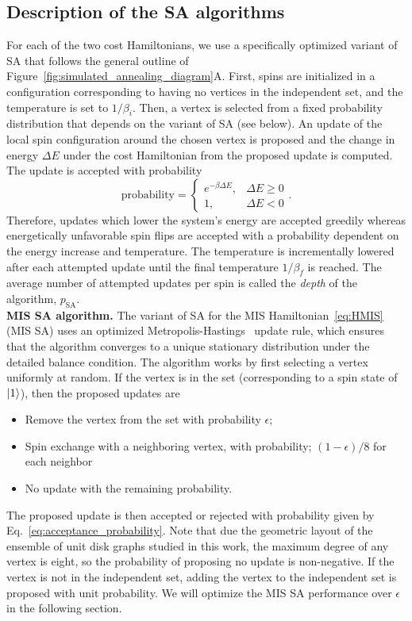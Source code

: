 \documentclass[twocolumn,amssymb,secnumarabic, prl, aps, nofootinbib]{revtex4-1}
\begin{document}
\subsection{Description of the SA algorithms\label{subsec:SA_description}}
For each of the two cost Hamiltonians, we use a specifically optimized variant of SA that follows the general outline of Figure~\ref{fig:simulated_annealing_diagram}A.
First, spins are initialized in a configuration corresponding to having no vertices in the independent set, and the temperature is set to $1/\beta_i$. Then, a vertex is selected from a fixed probability distribution that depends on the variant of SA (see below). An update of the local spin configuration around the chosen vertex is proposed and the change in energy $\Delta E$ under the cost Hamiltonian from the proposed update is computed. The update is accepted with probability
\begin{equation}
	\text{probability} = \begin{cases}
		e^{-\beta\Delta E}, & \Delta E \geq 0 \\
		1, & \Delta E < 0
	\end{cases}.\label{eq:acceptance_probability}
\end{equation}
Therefore, updates which lower the system's energy are accepted greedily whereas energetically unfavorable spin flips are accepted with a probability dependent on the energy increase and temperature. The temperature is incrementally lowered after each attempted update until the final temperature $1/\beta_f$ is reached. The average number of attempted updates per spin is called the \textit{depth} of the algorithm, $p_{\text{SA}}$.\\

\noindent\textbf{MIS SA algorithm.}
The variant of SA for the MIS Hamiltonian~\eqref{eq:HMIS} (MIS SA) uses an optimized Metropolis-Hastings~\cite{Hastings, Metropolis} update rule, which ensures that the algorithm converges to a unique stationary distribution under the detailed balance condition. The algorithm works by first selecting a vertex uniformly at random. If the vertex is in the set (corresponding to a spin state of $\ket{1}$), 
then the proposed updates are
\begin{itemize}
	\item Remove the vertex from the set with probability $\epsilon$;
	\item Spin exchange with a neighboring vertex,  with probability; $(1-\epsilon)/8$ for each neighbor
	\item No update with the remaining probability.
\end{itemize}
The proposed update is then accepted or rejected with probability given by Eq.~\eqref{eq:acceptance_probability}.
Note that due the geometric layout of the ensemble of unit disk graphs studied in this work, the maximum degree of any vertex is eight, so the probability of proposing no update is non-negative. If the vertex is not in the independent set, adding the vertex to the independent set is proposed with unit probability. 
We will optimize the MIS SA performance over $\epsilon$ in the following section.
\end{document}
